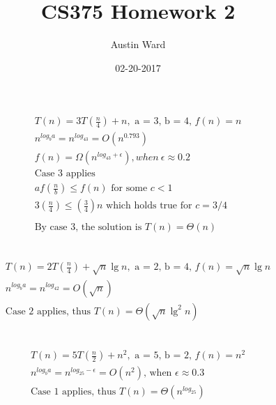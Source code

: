 \documentclass{report}
\title{CS375 Homework 2}
\date{02-20-2017}
\author{Austin Ward}
\begin{document}
\maketitle
\newpage
{}

\section{}

\subsection{}
\begin{eqnarray*}
  T(n) = 3T\left(\frac{n}{4}\right) + n,\text{ a = 3, b = 4, }f(n) = n \\
  n^{log_ba} = n^{log_43} = O(n^{0.793}) \\
  f(n) = \Omega(n^{log_43 + \epsilon}), when\:\epsilon \approx 0.2 \\
  \text{Case 3 applies}\\
  af\left(\frac{n}{b}\right) \leq f(n) \text{ for some } c < 1 \\
  3\left(\frac{n}{4}\right) \leq \left(\frac{3}{4}\right)n \text{ which holds true for } c = 3/4 \\
  \\
  \text{By case 3, the solution is } T(n) = \Theta(n) \\
\end{eqnarray*}


\subsection{}
\begin{eqnarray*}
  T(n) = 2T\left(\frac{n}{4}\right) + \sqrt{n}\lg n,\text{ a = 2, b = 4, }f(n) = \sqrt{n}\lg n \\
  n^{log_ba} = n^{log_42} = O(\sqrt{n}) \\
  \text{Case 2 applies, thus } T(n) = \Theta(\sqrt{n}\lg^2 n) \\
\end{eqnarray*}

\subsection{}
\begin{eqnarray*}
  T(n) = 5T\left(\frac{n}{2}\right) + n^2,\text{ a = 5, b = 2, }f(n) = n^2 \\
  n^{log_ba} = n^{log_25 - \epsilon} = O(n^2) \text{, when }\epsilon \approx 0.3\\
  \text{Case 1 applies, thus } T(n) = \Theta(n^{log_25}) \\
\end{eqnarray*}
\end{document}
